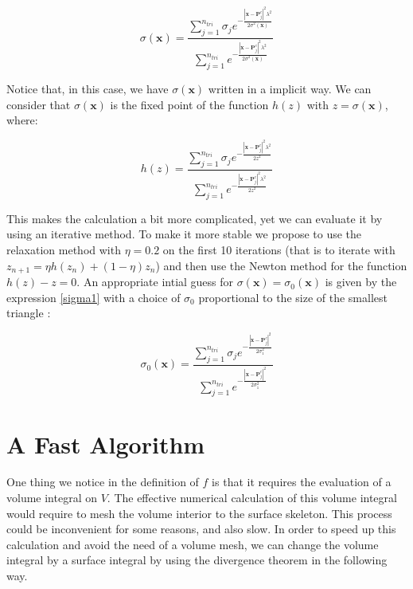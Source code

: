 \documentclass[11pt]{article}
\newcommand\bx{\boldsymbol x}
\newcommand\bP{\boldsymbol P}
\begin{document}
\begin{equation}\label{sigma2}
\sigma(\bx)=\frac{\sum_{j=1}^{n_{tri}}\sigma_je^{-\frac{|\bx-\bP_j^c|^2 \lambda^2}{2\sigma^2(\bx)}}}{\sum_{j=1}^{n_{tri}}e^{-\frac{|\bx-\bP_j^c|^2 \lambda^2}{2\sigma^2(\bx)}}}
\end{equation}

Notice that, in this case, we have $\sigma(\bx)$ written in a implicit way. We can consider that $\sigma(\bx)$ is the fixed point of the function $h(z)$ with $z=\sigma(\bx)$, where:

\begin{equation}\label{sigma2}
h(z)=\frac{\sum_{j=1}^{n_{tri}}\sigma_je^{-\frac{|\bx-\bP_j^c|^2 \lambda^2}{2z^2}}}{\sum_{j=1}^{n_{tri}}e^{-\frac{|\bx-\bP_j^c|^2 \lambda^2}{2z^2}}}
\end{equation}

This makes the calculation a bit more complicated, yet we can evaluate it by using an iterative method. To make it more stable we propose to use the relaxation method with $\eta=0.2$ on the first 10 iterations (that is to iterate with $z_{n+1}=\eta h(z_n)+(1-\eta)z_n$) and then use the Newton method for the function $h(z)-z=0$. An appropriate intial guess for $\sigma(\bx)=\sigma_0(\bx)$ is given by the expression \ref{sigma1} with a choice of $\sigma_0$ proportional to the size of the smallest triangle :
 
\begin{equation}\label{sigma0}
\sigma_0(\bx)=\frac{\sum_{j=1}^{n_{tri}}\sigma_je^{- \frac{|\bx-\bP_j^c|^2}{2\sigma^2_1}}}{\sum_{j=1}^{n_{tri}}e^{-\frac{|\bx-\bP_j^c|^2}{2\sigma^2_1}}}
\end{equation}







\section{A Fast Algorithm}


One thing we notice in the definition of $f$ is that it requires the evaluation of a volume integral on $\mathit{V}$. The effective numerical calculation of this volume integral would require to mesh the volume interior to the surface skeleton. This process could be inconvenient for some reasons, and also slow.  In order to speed up this calculation and avoid the need of a volume mesh, we can change the volume integral by a surface integral by using the divergence theorem in the following way.
\end{document}

